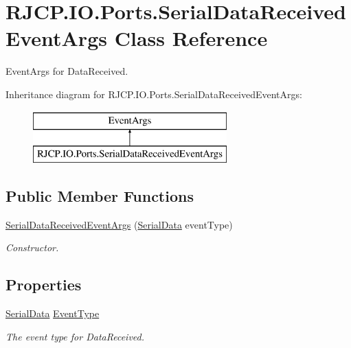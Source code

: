 \hypertarget{class_r_j_c_p_1_1_i_o_1_1_ports_1_1_serial_data_received_event_args}{}\section{R\+J\+C\+P.\+I\+O.\+Ports.\+Serial\+Data\+Received\+Event\+Args Class Reference}
\label{class_r_j_c_p_1_1_i_o_1_1_ports_1_1_serial_data_received_event_args}


Event\+Args for Data\+Received.  


Inheritance diagram for R\+J\+C\+P.\+I\+O.\+Ports.\+Serial\+Data\+Received\+Event\+Args\+:\begin{figure}[H]
\begin{center}
\leavevmode
\includegraphics[height=2.000000cm]{class_r_j_c_p_1_1_i_o_1_1_ports_1_1_serial_data_received_event_args}
\end{center}
\end{figure}
\subsection*{Public Member Functions}
\begin{DoxyCompactItemize}
\item 
\mbox{\hyperlink{class_r_j_c_p_1_1_i_o_1_1_ports_1_1_serial_data_received_event_args_a8741166bafc55d84245372c192cf149d}{Serial\+Data\+Received\+Event\+Args}} (\mbox{\hyperlink{namespace_r_j_c_p_1_1_i_o_1_1_ports_a2a76844574a0724e6b7755e2f6ec3681}{Serial\+Data}} event\+Type)
\begin{DoxyCompactList}\small\item\em Constructor. \end{DoxyCompactList}\end{DoxyCompactItemize}
\subsection*{Properties}
\begin{DoxyCompactItemize}
\item 
\mbox{\hyperlink{namespace_r_j_c_p_1_1_i_o_1_1_ports_a2a76844574a0724e6b7755e2f6ec3681}{Serial\+Data}} \mbox{\hyperlink{class_r_j_c_p_1_1_i_o_1_1_ports_1_1_serial_data_received_event_args_ab47001db1b05135e03c19f84f41255a7}{Event\+Type}}
\begin{DoxyCompactList}\small\item\em The event type for Data\+Received. \end{DoxyCompactList}\end{DoxyCompactItemize}



